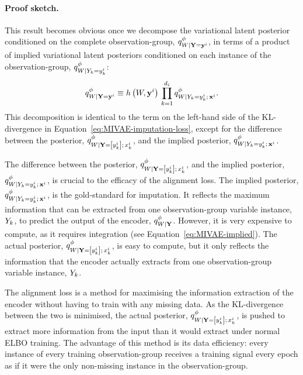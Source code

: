\documentclass[../thesis.tex]{subfiles}
\begin{document}
\begin{enumerate}
    \paragraph{Proof sketch.}  This result becomes obvious once we decompose the variational latent posterior conditioned on the complete observation-group, $\myfunc{q}^{\phi}_{\myrv{w} | \mygroup{\myrv{y}} = \mygroup{\myvect{y}}^i}$, in terms of a product of implied variational latent posteriors conditioned on each instance of the observation-group, $\myfunc{q}^{\phi}_{\myrv{w} | \myrv{y}_k = \myvect{y}^i_k}$:
    \[
        \myfunc{q}^{\phi}_{\myrv{w} | \mygroup{\myrv{y}} = \mygroup{\myvect{y}}^i} \equiv \myfunc{h} \left( \myrv{w}, \mygroup{\myvect{y}}^i \right) \, \prod_{k=1}^{\mycnt{d}_i} \myfunc{q}^{\phi}_{\myrv{w} | \myrv{y}_k = \myvect{y}^i_k; \, \mygroup{\myvect{x}}^i }.
    \]
    This decomposition is identical to the term on the left-hand side of the KL-divergence in Equation~\ref{eq:MIVAE-imputation-loss}, except for the difference between the posterior, $\myfunc{q}^{\phi}_{\myrv{w} | \mygroup{\myrv{y}} = \left[ \myvect{y}^i_k \right]; \, \myvect{x}^i_k}$, and the implied posterior, $\myfunc{q}^{\phi}_{\myrv{w} | \myrv{y}_k = \myvect{y}^i_k; \, \mygroup{\myvect{x}}^i}$.
\end{enumerate}

The difference between the posterior, $\myfunc{q}^{\phi}_{\myrv{w} | \mygroup{\myrv{y}} = \left[ \myvect{y}^i_k \right]; \, \myvect{x}^i_k}$, and the implied posterior, $\myfunc{q}^{\phi}_{\myrv{w} | \myrv{y}_k = \myvect{y}^i_k; \, \mygroup{\myvect{x}}^i }$, is crucial to the efficacy of the alignment loss. The implied posterior, $\myfunc{q}^{\phi}_{\myrv{w} | \myrv{y}_k = \myvect{y}^i_k; \, \mygroup{\myvect{x}}^i}$, is the gold-standard for imputation. It reflects the maximum information that can be extracted from one observation-group variable instance, $\myrv{y}_k$, to predict the output of the encoder, $\myfunc{q}^{\phi}_{\myrv{w} | \mygroup{\myrv{y}}}$. However, it is very expensive to compute, as it requires integration (see Equation~\ref{eq:MIVAE-implied}). The actual posterior, $\myfunc{q}^{\phi}_{\myrv{w} | \mygroup{\myrv{y}} = \left[ \myvect{y}^i_k \right]; \, \myvect{x}^i_k}$, is easy to compute, but it only reflects the information that the encoder actually extracts from one observation-group variable instance, $\myrv{y}_k$. 

The alignment loss is a method for maximising the information extraction of the encoder without having to train with any missing data. As the KL-divergence between the two is minimised, the actual posterior, $\myfunc{q}^{\phi}_{\myrv{w} | \mygroup{\myrv{y}} = \left[ \myvect{y}^i_k \right]; \, \myvect{x}^i_k}$, is pushed to extract more information from the input than it would extract under normal ELBO training. The advantage of this method is its data efficiency: every instance of every training observation-group receives a training signal every epoch as if it were the only non-missing instance in the observation-group.
\end{document}
